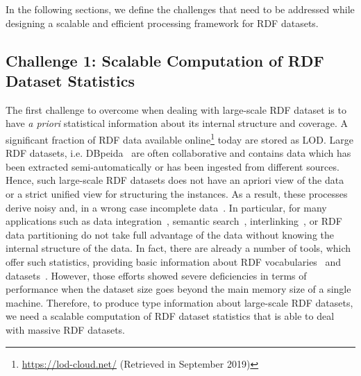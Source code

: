 In the following sections, we define the challenges that need to be addressed while designing a scalable and efficient processing framework for \gls{RDF} datasets.

\subsection{Challenge 1: Scalable Computation of RDF Dataset Statistics}
\label{sec:c1}
The first challenge to overcome when dealing with large-scale RDF dataset is to have \textit{a priori} statistical information about its internal structure and coverage.
A significant fraction of RDF data available online\footnote{\scriptsize \url{https://lod-cloud.net/} (Retrieved in September 2019)} today are stored as \gls{LOD}.
Large \gls{RDF} datasets, i.e. DBpeida~\cite{dbpedia-swj} are often collaborative and contains data which has been extracted semi-automatically or has been ingested from different sources.
Hence, such large-scale \gls{RDF} datasets does not have an apriori view of the data or a strict unified view for structuring the instances.
As a result, these processes derive noisy and, in a wrong case incomplete data~\cite{zaveri2015quality}.
In particular, for many applications such as data integration~\cite{michel:tel-01508602}, semantic search~\cite{Tonon2012CII}, interlinking~\cite{Dutta2014PAI}, or \gls{RDF} data partitioning do not take full advantage of the data without knowing the internal structure of the data.
In fact, there are already a number of tools, which offer such statistics, providing basic information about \gls{RDF} vocabularies~\cite{vandenbussche2015linked} and datasets~\cite{conf/dexaw/LangeggerW09,ermilov-2013-kesw}.
However, those efforts showed severe deficiencies in terms of performance when the dataset size goes beyond the main memory size of a single machine.
Therefore, to produce type information about large-scale \gls{RDF} datasets, we need a scalable computation of RDF dataset statistics that is able to deal with massive \gls{RDF} datasets.

